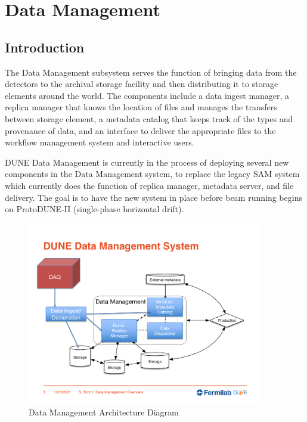 \chapter{Data Management  }
\label{ch:datamgmt}

\section{Introduction}
\label{sec:datamgmt:xyz}  %

The Data Management subsystem serves the function of bringing data from the detectors to the archival storage facility 
and then distributing it to storage elements around the world.  The components include a data ingest manager, a
replica manager that knows the location of files and manages the transfers between storage element, a metadata 
catalog that keeps track of the types and provenance of data, and an interface to deliver the appropriate files 
to the workflow management system and interactive users.

DUNE Data Management is currently in the process of deploying several new components in the Data Management
system, to replace the legacy SAM system which currently does the function of replica manager, metadata server, 
and file delivery.  The goal is to have the new system in place before beam running begins on ProtoDUNE-II
(single-phase horizontal drift).  


\begin{figure}[ht]
    \centering
\includegraphics[height=8cm]{graphics/DataManagement/data_mgmt_diagram.pdf}
    \caption{Data Management Architecture Diagram}
    \label{fig:datamanagement}
\end{figure}



